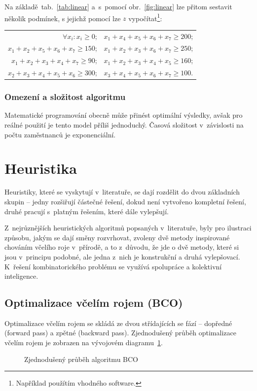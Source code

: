 \documentclass[twoside]{ctuthesis}
\begin{document}
Na základě~tab.~\ref{tab:linear} a~s~pomocí obr.~\ref{fig:linear} lze přitom sestavit několik podmínek, s jejichž pomocí lze $z$ vypočítat\footnote{Například použítím vhodného software.}:
\begin{center}
	\begin{tabular}{rl}
		$\forall x_i: x_i \geq 0$; & $x_1 + x_4 + x_5 + x_6 + x_7 \geq 200$; \\
		$x_1 + x_2 + x_5 + x_6 + x_7 \geq 150$; & $x_1 + x_2 + x_3 + x_6 + x_7 \geq 250$;\\
		$x_1 + x_2 + x_3 + x_4 + x_7 \geq 90$; & $x_1 + x_2 + x_3 + x_4 + x_5 \geq 160$; \\
		$x_2 + x_3 + x_4 + x_5 + x_6 \geq 300$; & $x_3 + x_4 + x_5 + x_6 + x_7 \geq 100$.
	\end{tabular}
\end{center}

\subsubsection{Omezení a složitost algoritmu}
Matematické programování obecně může přinést optimální výsledky, avšak pro reálné použití je tento model příliš jednoduchý. \cite{burke2004state} Časová složitost v~závislosti na počtu zaměstnanců je exponenciální. \cite{chen2016comparison}


\newpage
\section{Heuristika}

Heuristiky, které se vyskytují v~literatuře, se dají rozdělit do dvou základních skupin -- jedny rozšiřují částečné řešení, dokud není vytvořeno kompletní řešení, druhé pracují s~platným řešením, které dále vylepšují. \cite{van2013personnel}

Z~nejrůznějších heuristických algoritmů popsaných v~literatuře, byly pro ilustraci způsobu, jakým se dají směny rozvrhovat, zvoleny dvě metody inspirované chováním včelího roje v~přírodě, a to z~důvodu, že jde o dvě metody, které si jsou v~principu podobné, ale jedna z~nich je konstrukční a druhá vylepšovací. K~řešení kombinatorického problému se využívá spolupráce a kolektivní inteligence. %

\subsection{Optimalizace včelím rojem (BCO)}
Optimalizace včelím rojem se skládá ze dvou střídajících se fází -- dopředné (forward pass) a zpětné (backward pass). Zjednodušený průběh optimalizace včelím rojem je zobrazen na vývojovém diagramu~\ref{fig:bcoflow}.
\begin{figure}[h]
	
	\caption{Zjednodušený průběh algoritmu BCO}
	\label{fig:bcoflow}
\end{figure}
\end{document}
